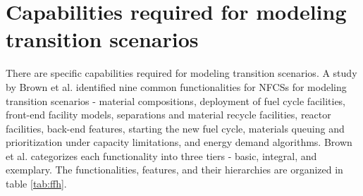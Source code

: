 \section{Capabilities required for modeling transition scenarios}
There are specific capabilities required for modeling transition
scenarios. A study by Brown et al. \cite{brown_identification_2016}
identified nine common functionalities for \glspl{NFCS} for modeling
transition scenarios - material compositions, deployment of fuel
cycle facilities, front-end facility models, separations and material
recycle facilities, reactor facilities, back-end features, starting
the new fuel cycle, materials queuing and prioritization under
capacity limitations, and energy demand algorithms. Brown et al.
categorizes each functionality into three tiers - basic, integral,
and exemplary. The functionalities, features, and their hierarchies
are organized in table \ref{tab:ffh}.

